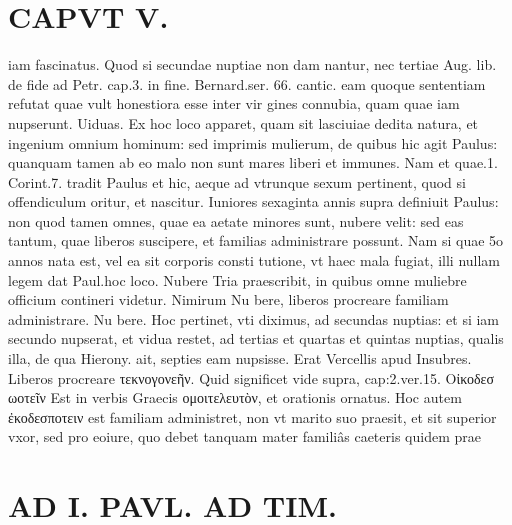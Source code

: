 \documentclass{article}
\begin{document}
\begin{pages}
\section*{CAPVT  V. }
\marginpar{[ p.299 ]}\pstart iam fascinatus. Quod si secundae nuptiae non dam nantur, nec tertiae Aug. lib.  de fide ad Petr. cap.3. in fine. Bernard.ser. 66. cantic. eam quoque sententiam refutat quae vult honestiora esse inter vir gines connubia, quam quae iam nupserunt. Uiduas. Ex hoc loco apparet, quam sit lasciuiae dedita natura, et ingenium omnium hominum: sed imprimis mulierum, de quibus hic agit Paulus: quanquam tamen ab eo malo non sunt mares liberi et immunes. Nam et quae.1. Corint.7. tradit Paulus et hic, aeque ad vtrunque sexum pertinent, quod si offendiculum oritur, et nascitur. Iuniores sexaginta annis supra definiuit Paulus: non quod tamen omnes, quae ea aetate minores sunt, nubere velit: sed eas tantum, quae liberos suscipere, et familias administrare possunt. Nam si quae 5o annos nata est, vel ea sit corporis consti tutione, vt haec mala fugiat, illi nullam legem dat Paul.hoc loco. Nubere Tria praescribit, in quibus omne muliebre officium contineri videtur. Nimirum Nu bere, liberos procreare familiam administrare. Nu bere. Hoc pertinet, vti diximus, ad secundas nuptias: et si iam secundo nupserat, et vidua restet, ad tertias et quartas et quintas nuptias, qualis illa, de qua Hierony. ait, septies eam nupsisse. Erat Vercellis apud Insubres. Liberos procreare τεκνογονεῆν. Quid significet vide supra, cap:2.ver.15. Oἰκοδεσ ωοτεῖν Est in verbis Graecis ομοιτελευτὸν, et orationis ornatus. Hoc autem ἐκοδεσποτειν est familiam administret, non vt marito suo praesit, et sit superior vxor, sed pro eoiure, quo debet tanquam mater familiâs caeteris quidem prae\pend
\section*{AD I. PAVL. AD TIM. }
\marginpar{[ p.300 ]}\pstart {}
{}

\end{pages}
\end{document}
